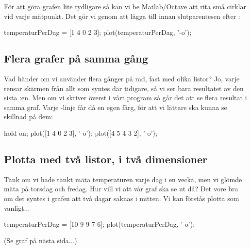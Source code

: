 För att göra grafen lite tydligare så kan vi be Matlab/Octave att rita små cirklar vid varje mätpunkt. Det gör vi genom att lägga till  innan slutparentesen efter :

\begin{matlab}[caption={Vår andra graf},label={}]
temperaturPerDag = [1 4 0 2 3];
plot(temperaturPerDag, '-o');
\end{matlab}


\subsection{Flera grafer på samma gång}

Vad händer om vi använder  flera gånger på rad, fast med olika listor? Jo, varje  rensar skärmen från allt som syntes där tidigare, så vi ser bara resultatet av den sista :en. Men om vi skriver  överst i vårt program så går det att se flera resultat i samma graf. Varje -linje får då en egen färg, för att vi lättare ska kunna se skillnad på dem:
\newpage
\begin{matlab}[caption={Två grafer i en},label={}]
hold on;
plot([1 4 0 2 3], '-o');
plot([4 5 4 3 2], '-o');
\end{matlab}


\subsection{Plotta med två listor, i två dimensioner}\label{subsec:plottwodim}

Tänk om vi hade tänkt mäta temperaturen varje dag i en vecka, men vi glömde mäta på torsdag och fredag. Hur vill vi att vår graf ska se ut då? Det vore bra om det syntes i grafen att två dagar saknas i mitten. Vi kan förstås plotta som vanligt...

\begin{matlab}[caption={Syns inte att torsdag och fredag saknas},label={}]
temperaturPerDag = [10 9 9 7 6];
plot(temperaturPerDag, '-o');
\end{matlab}
(Se graf på nästa sida...)
\newpage
{}

